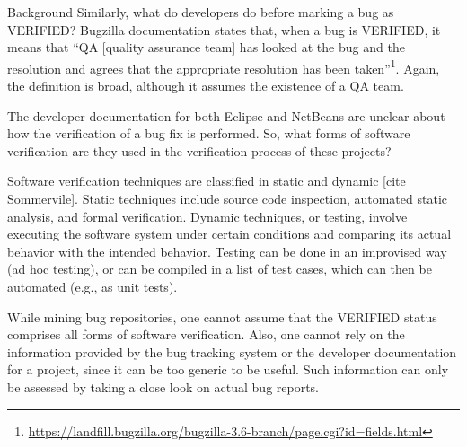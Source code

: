 \begin{section}{Background}
Similarly, what do developers do before marking a bug as VERIFIED? Bugzilla documentation states that, when a bug is VERIFIED, it means that ``QA [quality assurance team] has looked at the bug and the resolution and agrees that the appropriate resolution has been taken''\footnote{\url{https://landfill.bugzilla.org/bugzilla-3.6-branch/page.cgi?id=fields.html}}. Again, the definition is broad, although it assumes the existence of a QA team.

The developer documentation for both Eclipse and NetBeans are unclear about how the verification of a bug fix is performed. So, what forms of  software verification are they used in the verification process of these projects?

Software verification techniques are classified in static and dynamic [cite Sommervile]. Static techniques include source code inspection, automated static analysis, and formal verification. Dynamic techniques, or testing, involve executing the software system under certain conditions and comparing its actual behavior with the intended behavior. Testing can be done in an improvised way (ad hoc testing), or can be compiled in a list of test cases, which can then be automated (e.g., as unit tests).

While mining bug repositories, one cannot assume that the VERIFIED status comprises all forms of software verification. Also, one cannot rely on the information provided by the bug tracking system or the developer documentation for a project, since it can be too generic to be useful. Such information can only be assessed by taking a close look on actual bug reports.

% 
% 

\end{section}


